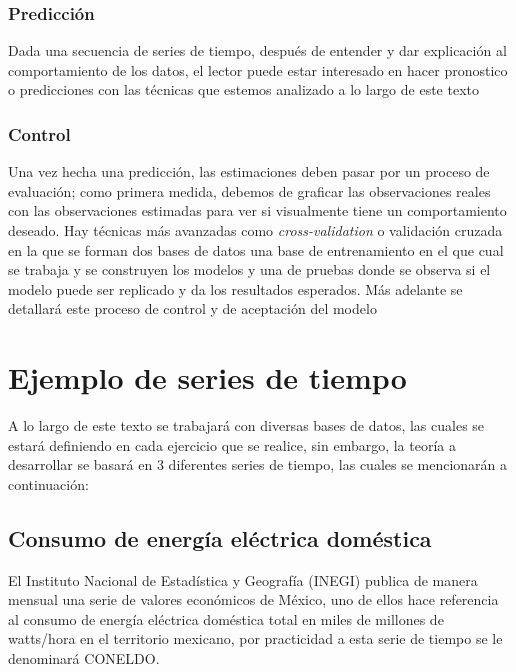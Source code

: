 \documentclass[
  spanish,
]{book}
\theoremstyle{remark}
\begin{document}
\hypertarget{predicciuxf3n}{%
\subsubsection*{Predicción}\label{predicciuxf3n}}

Dada una secuencia de series de tiempo, después de entender y dar explicación al comportamiento de los datos, el lector puede estar interesado en hacer pronostico o predicciones con las técnicas que estemos analizado a lo largo de este texto

\hypertarget{control}{%
\subsubsection*{Control}\label{control}}

Una vez hecha una predicción, las estimaciones deben pasar por un proceso de evaluación; como primera medida, debemos de graficar las observaciones reales con las observaciones estimadas para ver si visualmente tiene un comportamiento deseado. Hay técnicas más avanzadas como \emph{cross-validation} o validación cruzada en la que se forman dos bases de datos una base de entrenamiento en el que cual se trabaja y se construyen los modelos y una de pruebas donde se observa si el modelo puede ser replicado y da los resultados esperados. Más adelante se detallará este proceso de control y de aceptación del modelo

\hypertarget{ejemplo-de-series-de-tiempo}{%
\section{Ejemplo de series de tiempo}\label{ejemplo-de-series-de-tiempo}}

A lo largo de este texto se trabajará con diversas bases de datos, las cuales se estará definiendo en cada ejercicio que se realice, sin embargo, la teoría a desarrollar se basará en 3 diferentes series de tiempo, las cuales se mencionarán a continuación:

\hypertarget{consumo-de-energuxeda-eluxe9ctrica-domuxe9stica}{%
\subsection{Consumo de energía eléctrica doméstica}\label{consumo-de-energuxeda-eluxe9ctrica-domuxe9stica}}

El Instituto Nacional de Estadística y Geografía (INEGI) publica de manera mensual una serie de valores económicos de México, uno de ellos hace referencia al consumo de energía eléctrica doméstica total en miles de millones de watts/hora en el territorio mexicano, por practicidad a esta serie de tiempo se le denominará CONELDO.
\end{document}
